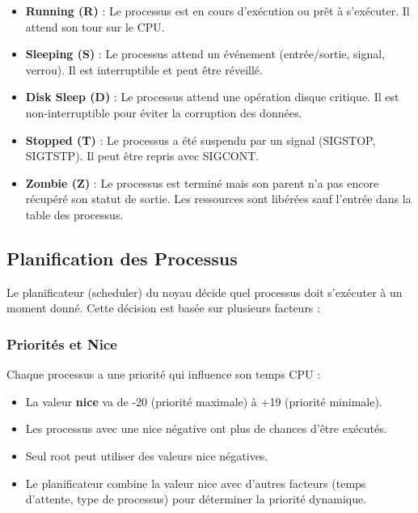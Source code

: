 \documentclass[12pt,a4paper]{article}
\begin{document}
\begin{itemize}
    \item \textbf{Running (R)} : Le processus est en cours d'exécution ou prêt à s'exécuter. Il attend son tour sur le CPU.
    
    \item \textbf{Sleeping (S)} : Le processus attend un événement (entrée/sortie, signal, verrou). Il est interruptible et peut être réveillé.
    
    \item \textbf{Disk Sleep (D)} : Le processus attend une opération disque critique. Il est non-interruptible pour éviter la corruption des données.
    
    \item \textbf{Stopped (T)} : Le processus a été suspendu par un signal (SIGSTOP, SIGTSTP). Il peut être repris avec SIGCONT.
    
    \item \textbf{Zombie (Z)} : Le processus est terminé mais son parent n'a pas encore récupéré son statut de sortie. Les ressources sont libérées sauf l'entrée dans la table des processus.
\end{itemize}

\subsection{Planification des Processus}

Le planificateur (scheduler) du noyau décide quel processus doit s'exécuter à un moment donné. Cette décision est basée sur plusieurs facteurs :

\subsubsection{Priorités et Nice}
Chaque processus a une priorité qui influence son temps CPU :

\begin{itemize}
    \item La valeur \textbf{nice} va de -20 (priorité maximale) à +19 (priorité minimale).
    \item Les processus avec une nice négative ont plus de chances d'être exécutés.
    \item Seul root peut utiliser des valeurs nice négatives.
    \item Le planificateur combine la valeur nice avec d'autres facteurs (temps d'attente, type de processus) pour déterminer la priorité dynamique.
\end{itemize}
\end{document}
